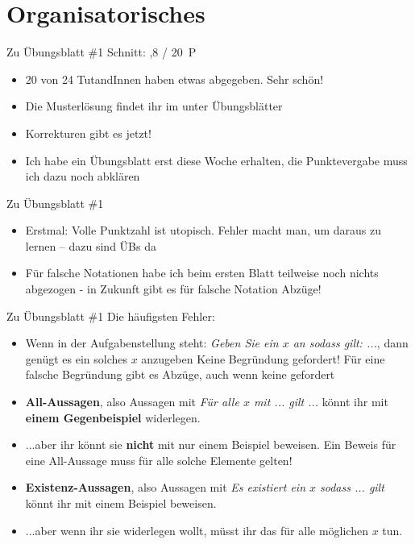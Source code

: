 



\morescalingdelimiters



\section{Organisatorisches}

\begin{frame}{Zu Übungsblatt \#1}
	Schnitt: ,8 / 20~P

	\begin{itemize}[<+->]
		\item 20 von 24 TutandInnen haben etwas abgegeben. Sehr schön!
		\item Die Musterlösung findet ihr im \ILIAS unter Übungsblätter
		\item Korrekturen gibt es jetzt!
		\item Ich habe ein Übungsblatt erst diese Woche erhalten, die Punktevergabe muss ich dazu noch abklären
	\end{itemize}
\end{frame}

\begin{frame}{Zu Übungsblatt \#1}	
	\begin{itemize}[<+->]
		\item Erstmal: Volle Punktzahl ist utopisch. Fehler macht man, um daraus zu lernen – dazu sind ÜBs da
		\item Für falsche Notationen habe ich beim ersten Blatt teilweise noch nichts abgezogen - in Zukunft gibt es für falsche Notation Abzüge!
	\end{itemize}
\end{frame}

\begin{frame}{Zu Übungsblatt \#1}
	Die häufigsten Fehler:
	\begin{itemize}[<+->]
		\item Wenn in der Aufgabenstellung steht: \textit{Geben Sie ein $x$ an sodass gilt: ...}, dann genügt es ein solches $x$ anzugeben
		\implitem Keine Begründung gefordert!
		\implitem Für eine falsche Begründung gibt es Abzüge, auch wenn keine gefordert
		\item \textbf{All-Aussagen}, also Aussagen mit \textit{Für alle $x$ mit ... gilt ...} könnt ihr mit \textbf{einem Gegenbeispiel} widerlegen.
		\item ...aber ihr könnt sie \textbf{nicht} mit nur einem Beispiel beweisen. Ein Beweis für eine All-Aussage muss für alle solche Elemente gelten!
		\item \textbf{Existenz-Aussagen}, also Aussagen mit \textit{Es existiert ein $x$ sodass ... gilt} könnt ihr mit einem Beispiel beweisen.
		\item ...aber wenn ihr sie widerlegen wollt, müsst ihr das für alle möglichen $x$ tun.
	\end{itemize}
\end{frame}

